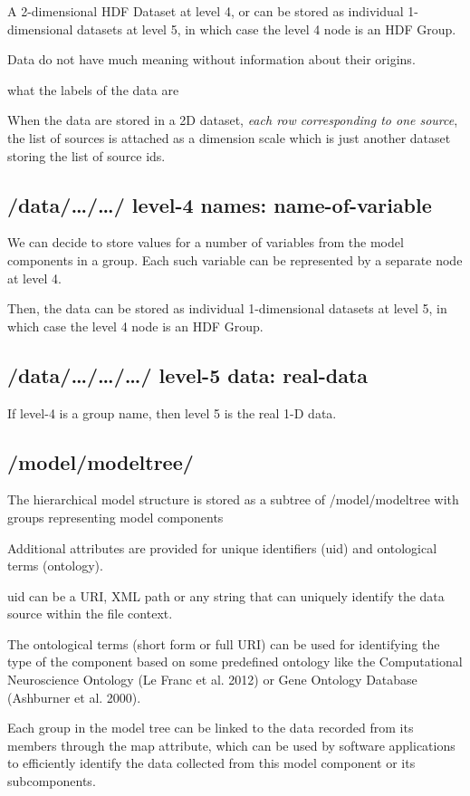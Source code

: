 A 2-dimensional HDF Dataset at level 4, or can be stored as
individual 1-dimensional datasets at level 5, in which
case the level 4 node is an HDF Group.

Data do not have much meaning without information about
their origins.

what the labels of the data are

When the data are stored in a 2D dataset, {\it each row corresponding to one
source}, the list of sources is attached as a dimension scale which is just
another dataset storing the list of source ids.




\subsection{/data/\ldots/\ldots/ level-4 names: name-of-variable}
\label{sec:NSDF-format-/data/-level-4}

We can decide to store values for a number of variables from the model
components in a group. Each such variable can be represented
by a separate node at level 4.

Then, the data can be stored as individual 1-dimensional datasets at level 5, in
which case the level 4 node is an HDF Group.

\subsection{/data/\ldots/\ldots/\ldots/ level-5 data: real-data}
\label{sec:NSDF-format-/data/-level-4}

If level-4 is a group name, then level 5 is the real 1-D data.



\subsection{/model/modeltree/}
\label{sec:NSDF-format-/model/modeltree}

The hierarchical model
structure is stored as a subtree of /model/modeltree
with groups representing model components

Additional attributes are provided for unique identifiers
(uid) and ontological terms (ontology).

uid can be a URI, XML path or any string that can uniquely identify the data
source within the file context.

The ontological terms (short form or full URI) can be used for identifying the
type of the component based on some predefined ontology like the Computational
Neuroscience Ontology (Le Franc et al. 2012) or Gene Ontology Database
(Ashburner et al.
2000).

Each group in the model tree can be linked to the data
recorded from its members through the map attribute, which
can be used by software applications to efficiently identify
the data collected from this model component or its subcomponents.

